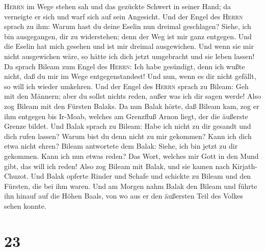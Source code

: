 \textsc{Herrn} im Wege stehen sah und das gezückte Schwert in seiner
Hand; da verneigte er sich und warf sich auf sein Angesicht.
 Und der Engel des \textsc{Herrn} sprach zu ihm: Warum
hast du deine Eselin nun dreimal geschlagen? Siehe, ich bin ausgegangen,
dir zu widerstehen; denn der Weg ist mir ganz entgegen. 
Und die Eselin hat mich gesehen und ist mir dreimal ausgewichen. Und
wenn sie mir nicht ausgewichen wäre, so hätte ich dich jetzt umgebracht
und sie leben lassen!  Da sprach Bileam zum Engel des
\textsc{Herrn}: Ich habe gesündigt, denn ich wußte nicht, daß du mir im
Wege entgegenstandest! Und nun, wenn es dir nicht gefällt, so will ich
wieder umkehren.  Und der Engel des \textsc{Herrn} sprach
zu Bileam: Geh mit den Männern; aber du sollst nichts reden, außer was
ich dir sagen werde! Also zog Bileam mit den Fürsten Balaks.
 Da nun Balak hörte, daß Bileam kam, zog er ihm entgegen
bis Ir-Moab, welches am Grenzfluß Arnon liegt, der die äußerste Grenze
bildet.  Und Balak sprach zu Bileam: Habe ich nicht zu
dir gesandt und dich rufen lassen? Warum bist du denn nicht zu mir
gekommen? Kann ich dich etwa nicht ehren?  Bileam
antwortete dem Balak: Siehe, ich bin jetzt zu dir gekommen. Kann ich nun
etwas reden? Das Wort, welches mir Gott in den Mund gibt, das will ich
reden!  Also zog Bileam mit Balak, und sie kamen nach
Kirjath-Chuzot.  Und Balak opferte Rinder und Schafe und
schickte zu Bileam und den Fürsten, die bei ihm waren. 
Und am Morgen nahm Balak den Bileam und führte ihn hinauf auf die Höhen
Baals, von wo aus er den äußersten Teil des Volkes sehen konnte.

\hypertarget{section-22}{%
\section{23}\label{section-22}}

